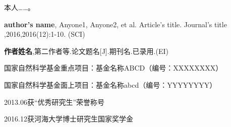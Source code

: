 
\begin{resume}


本人……。


\begin{publications}
	\item \textbf{author's name}, Anyone1, Anyone2, et al. Article's title. Journal's title ,2016,2016(12):1-10. (SCI)
	\item \textbf{作者姓名},第二作者等.论文题名[J].期刊名.已录用.(EI)	
\end{publications}


\begin{projects}
	\item 国家自然科学基金重点项目：基金名称ABCD（编号：XXXXXXXX）
	\item 国家自然科学基金面上项目：基金名称abcd（编号：YYYYYYYY）
\end{projects}


\begin{honours}
	\item 2013.06\hspace{1em}获“优秀研究生”荣誉称号
	\item 2016.12\hspace{1em}获河海大学博士研究生国家奖学金
\end{honours}

\end{resume}
